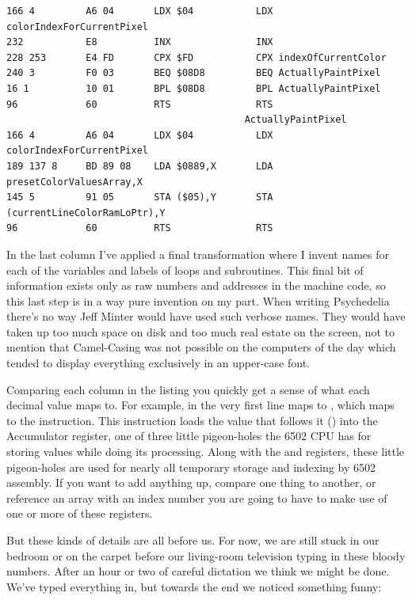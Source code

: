 \begin{lstlisting}[basicstyle=\ttfamily\scriptsize]
166 4         A6 04       LDX $04           LDX colorIndexForCurrentPixel                    
232           E8          INX               INX                                              
228 253       E4 FD       CPX $FD           CPX indexOfCurrentColor                          
240 3         F0 03       BEQ $08D8         BEQ ActuallyPaintPixel                           
16 1          10 01       BPL $08D8         BPL ActuallyPaintPixel                           
96            60          RTS               RTS                                              
                                          ActuallyPaintPixel                               
166 4         A6 04       LDX $04           LDX colorIndexForCurrentPixel                    
189 137 8     BD 89 08    LDA $0889,X       LDA presetColorValuesArray,X                     
145 5         91 05       STA ($05),Y       STA (currentLineColorRamLoPtr),Y       
96            60          RTS               RTS                               
\end{lstlisting}

In the last column I've applied a final transformation where I invent names for each of the variables and
labels of loops and subroutines. This final bit of information exists only as raw numbers and addresses
in the machine code, so this last step is in a way pure invention on my part. When writing Psychedelia
there's no way Jeff Minter would have used such verbose names. They would have taken up too much space on
disk and too much real estate on the screen, not to mention that Camel-Casing was not possible on the computers
of the day which tended to display everything exclusively in an upper-case font. 

Comparing each column in the listing you quickly get a sense of what each decimal value maps to. For example, in
the very first line
 maps to , which maps to the  instruction. This instruction loads the value
that follows it () into the Accumulator register, one of three little pigeon-holes the 6502 CPU
has for storing values while doing its processing. Along with the  and  registers, these little
pigeon-holes are used for nearly all temporary storage and indexing by 6502 assembly. If you want to add anything up,
compare one thing to another, or reference an array with an index number you are going to have to make use of one
or more of these registers.

But these kinds of details are all before us. For now, we are still stuck in our bedroom or on the carpet before
our living-room television typing in these bloody numbers. After an hour or two of careful dictation we think
we might be done. We've typed everything in, but towards the end we noticed something funny:

